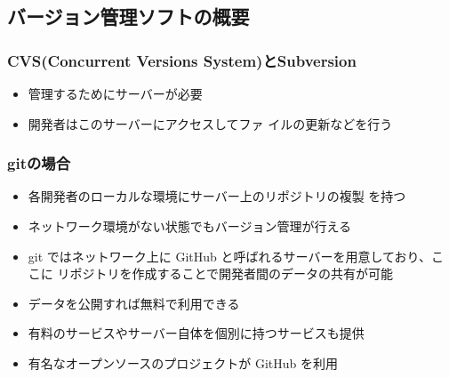 \subsection{バージョン管理ソフトの概要}
\begin{frame}[containsverbatim]
 \frametitle{CVS(Concurrent Versions System)とSubversion}
 \begin{itemize}
  \item 管理するためにサーバーが必要
  \item 開発者はこのサーバーにアクセスしてファ
イルの更新などを行う
 \end{itemize}
\end{frame}
\begin{frame}[containsverbatim]
 \frametitle{gitの場合}
 \begin{itemize}
  \item 各開発者のローカルな環境にサーバー上のリポジトリの複製
を持つ
  \item ネットワーク環境がない状態でもバージョン管理が行える
  \item git ではネットワーク上に GitHub と呼ばれるサーバーを用意しており、ここに
リポジトリを作成することで開発者間のデータの共有が可能
  \item データを公開すれば無料で利用できる
  \item 有料のサービスやサーバー自体を個別に持つサービスも提供
  \item 有名なオープンソースのプロジェクトが GitHub を利用
 \end{itemize}
\end{frame}
